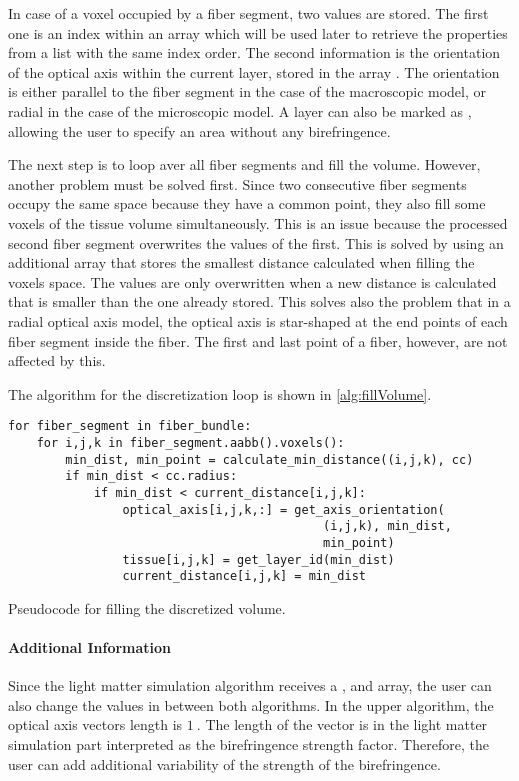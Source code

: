 \par
%
In case of a voxel occupied by a fiber segment, two values are stored.
The first one is an index within an array  which will be used later to retrieve the properties from a list with the same index order.
The second information is the orientation of the optical axis within the current layer, stored in the array .
The orientation is either parallel to the fiber segment in the case of the macroscopic model, or radial in the case of the microscopic model.
A layer can also be marked as , allowing the user to specify an area without any birefringence.
\par
%
The next step is to loop aver all fiber segments and fill the volume.
However, another problem must be solved first.
Since two consecutive fiber segments occupy the same space because they have a common point, they also fill some voxels of the tissue volume simultaneously.
This is an issue because the processed second fiber segment overwrites the values of the first.
This is solved by using an additional array that stores the smallest distance calculated when filling the voxels space.
The values are only overwritten when a new distance is calculated that is smaller than the one already stored.
This solves also the problem that in a radial optical axis model, the optical axis is star-shaped at the end points of each fiber segment inside the fiber.
The first and last point of a fiber, however, are not affected by this.
\par
%
The algorithm for the discretization loop is shown in \cref{alg:fillVolume}.
%
\begin{lstfloat}[!tb]
\lstset{style=python}
\begin{lstlisting}[]
for fiber_segment in fiber_bundle:
    for i,j,k in fiber_segment.aabb().voxels():
        min_dist, min_point = calculate_min_distance((i,j,k), cc)
        if min_dist < cc.radius:
            if min_dist < current_distance[i,j,k]:
                optical_axis[i,j,k,:] = get_axis_orientation(
                                            (i,j,k), min_dist,
                                            min_point)
                tissue[i,j,k] = get_layer_id(min_dist)
                current_distance[i,j,k] = min_dist
\end{lstlisting}
\caption{Pseudocode for filling the discretized volume.}
\label{alg:fillVolume}
\end{lstfloat}
%
\paragraph{Additional Information}
Since the light matter simulation algorithm receives a ,  and  array, the user can also change the values in between both algorithms.
In the upper algorithm, the optical axis vectors length is $\SI{1}{}$.
The length of the vector is in the light matter simulation part interpreted as the birefringence strength factor.
Therefore, the user can \eg{} add additional variability of the strength of the birefringence.
%
%
%
